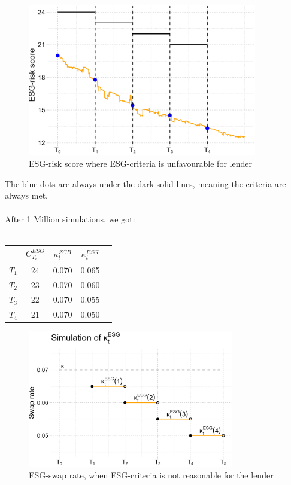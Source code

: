 \begin{figure}[htp]
    \centering
    \includegraphics[width= 10cm]{figures/ESG/ESG_plt_criteria2.png}
    \caption{ESG-risk score where ESG-criteria is unfavourable for lender}
    \label{fig: ESG_risk_criteria_2}
\end{figure}

The blue dots are always under the dark solid lines, meaning the criteria are always met.
\\~\\ 
After 1 Million simulations, we got:
\\~\\
\begin{center}
\begin{tabular}{lcccl}
\toprule
           &$C_{T_{i}}^{ESG}$ & $\kappa_{t}^{ZCB}$  & $\kappa_{t}^{ESG}$ \\
\midrule
$T_{1}$ &  24 & 0.070 & 0.065 \\
$T_{2}$ &  23 & 0.070 & 0.060 \\
$T_{3}$ &  22 & 0.070 & 0.055 \\
$T_{4}$ &  21 & 0.070 & 0.050 \\
\bottomrule
\end{tabular}
\end{center}


\begin{figure}[htp]
    \centering
    \includegraphics[width= 9cm]{figures/ESG/kappa_t_ESG_2.png}
    \caption{ESG-swap rate, when ESG-criteria is not reasonable for the lender}
    \label{fig: ESG_swap_2}
\end{figure}

